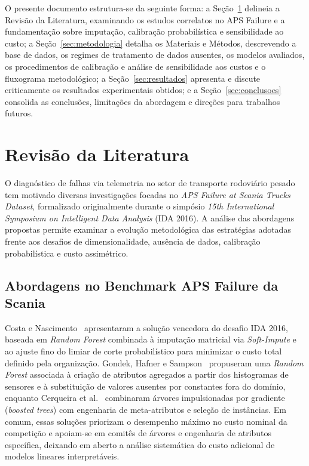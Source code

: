 \documentclass[conference]{IEEEtran}
\begin{document}
O presente documento estrutura-se da seguinte forma: a Seção~\ref{sec:trabalhos_relacionados} delineia a Revisão da Literatura, examinando os estudos correlatos no APS Failure e a fundamentação sobre imputação, calibração probabilística e sensibilidade ao custo; a Seção~\ref{sec:metodologia} detalha os Materiais e Métodos, descrevendo a base de dados, os regimes de tratamento de dados ausentes, os modelos avaliados, os procedimentos de calibração e análise de sensibilidade aos custos e o fluxograma metodológico; a Seção~\ref{sec:resultados} apresenta e discute criticamente os resultados experimentais obtidos; e a Seção~\ref{sec:conclusoes} consolida as conclusões, limitações da abordagem e direções para trabalhos futuros.

\section{Revisão da Literatura}
\label{sec:trabalhos_relacionados}

O diagnóstico de falhas via telemetria no setor de transporte rodoviário pesado tem motivado diversas investigações focadas no \textit{APS Failure at Scania Trucks Dataset}, formalizado originalmente durante o simpósio \textit{15th International Symposium on Intelligent Data Analysis} (IDA 2016). A análise das abordagens propostas permite examinar a evolução metodológica das estratégias adotadas frente aos desafios de dimensionalidade, ausência de dados, calibração probabilística e custo assimétrico.

\subsection{Abordagens no Benchmark APS Failure da Scania}

Costa e Nascimento~\cite{costa2016ida} apresentaram a solução vencedora do desafio IDA 2016, baseada em \textit{Random Forest} combinada à imputação matricial via \textit{Soft-Impute} e ao ajuste fino do limiar de corte probabilístico para minimizar o custo total definido pela organização. Gondek, Hafner e Sampson~\cite{gondek2016prediction} propuseram uma \textit{Random Forest} associada à criação de atributos agregados a partir dos histogramas de sensores e à substituição de valores ausentes por constantes fora do domínio, enquanto Cerqueira et al.~\cite{cerqueira2016combining} combinaram árvores impulsionadas por gradiente (\textit{boosted trees}) com engenharia de meta-atributos e seleção de instâncias. Em comum, essas soluções priorizam o desempenho máximo no custo nominal da competição e apoiam-se em comitês de árvores e engenharia de atributos específica, deixando em aberto a análise sistemática do custo adicional de modelos lineares interpretáveis.
\end{document}
